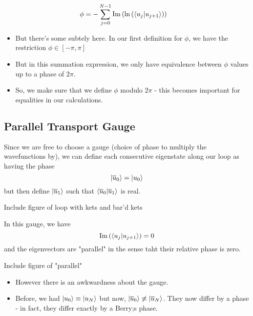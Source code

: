 \documentclass[11pt]{article}
\begin{document}
\begin{align*}
  \phi &= -\sum_{j = 0}^{N-1} \mathrm{Im} \left( \mathrm{ln}\left( \langle u_j | u_{j+1} \rangle \right)\right)
\end{align*}

 \begin{itemize}
  \item But there's some subtely here. In our first definition for $\phi$, we have the restriction $\phi \in [-\pi, \pi]$
  \item But in this summation expression, we only have equivalence between $\phi$ values up to a phase of $2\pi$.
  \item So, we make sure that we define $\phi$ modulo $2\pi$ - this becomes important for equalities in our calculations.
\end{itemize} 

\vskip 1cm
\subsection{Parallel Transport Gauge}
Since we are free to choose a gauge (choice of phase to multiply the wavefunctions by), we can define each consecutive eigenstate along our loop as having the phase $$ \lvert\overline{u}_0\rangle = \lvert u_0\rangle $$ but then define $\lvert\overline{u}_1\rangle$ such that $\langle \overline{u}_0 | \overline{u}_1 \rangle$ is real.
\begin{center}
  Include figure of loop with kets and bar'd kets
\end{center} In this gauge, we have $$ \mathrm{Im} \left(\langle u_j | u_{j+1} \rangle\right) = 0 $$ and the eigenvectors are "parallel" in the sense taht their relative phase is zero.
\begin{center}
  Include figure of "parallel"
\end{center}

\begin{itemize}
  \item However there is an awkwardness about the gauge.
  \item Before, we had $ \lvert u_0\rangle \equiv \lvert u_N\rangle $ but now, $\lvert\overline{u}_0\rangle \not\equiv \lvert\overline{u}_N\rangle$. They now differ by a phase - in fact, they differ exactly by  a Berry;s phase.
\end{itemize}

\vskip 1cm
\end{document}
